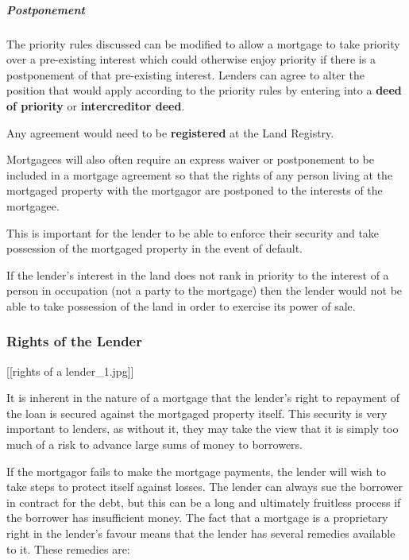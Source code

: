 \documentclass[
]{article}
\newenvironment{Shaded}{}{}
\newcommand{\NormalTok}[1]{#1}
\begin{document}
\hypertarget{postponement}{%
\subparagraph{Postponement}\label{postponement}}

The priority rules discussed can be modified to allow a mortgage to take
priority over a pre-existing interest which could otherwise enjoy
priority if there is a postponement of that pre-existing interest.
Lenders can agree to alter the position that would apply according to
the priority rules by entering into a \textbf{deed of priority} or
\textbf{intercreditor deed}.

Any agreement would need to be \textbf{registered} at the Land Registry.

\begin{Shaded}
\begin{Highlighting}[]
\NormalTok{Mortgagees will also often require an express waiver or postponement to be included in a mortgage agreement so that the rights of any person living at the mortgaged property with the mortgagor are postponed to the interests of the mortgagee.}

\NormalTok{This is important for the lender to be able to enforce their security and take possession of the mortgaged property in the event of default.}

\NormalTok{If the lender’s interest in the land does not rank in priority to the interest of a person in occupation (not a party to the mortgage) then the lender would not be able to take possession of the land in order to exercise its power of sale.}
\end{Highlighting}
\end{Shaded}

\hypertarget{rights-of-the-lender}{%
\subsubsection{Rights of the Lender}\label{rights-of-the-lender}}

{[}{[}rights of a lender\_1.jpg{]}{]}

It is inherent in the nature of a mortgage that the lender's right to
repayment of the loan is secured against the mortgaged property itself.
This security is very important to lenders, as without it, they may take
the view that it is simply too much of a risk to advance large sums of
money to borrowers.

If the mortgagor fails to make the mortgage payments, the lender will
wish to take steps to protect itself against losses. The lender can
always sue the borrower in contract for the debt, but this can be a long
and ultimately fruitless process if the borrower has insufficient money.
The fact that a mortgage is a proprietary right in the lender's favour
means that the lender has several remedies available to it. These
remedies are:
\end{document}
